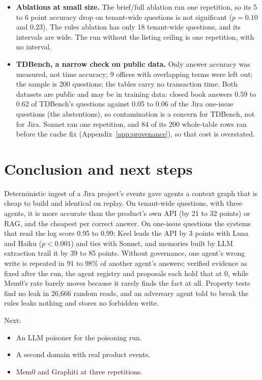 \documentclass{article}
\begin{document}
\begin{itemize}[leftmargin=*]
\item \textbf{Ablations at small size.} The brief/full ablation ran one repetition, so its 5 to 6 point accuracy drop on tenant-wide questions is not significant ($p = 0.10$ and $0.23$). The rules ablation has only 18 tenant-wide questions, and its intervals are wide. The run without the listing ceiling is one repetition, with no interval.
\item \textbf{TDBench, a narrow check on public data.} Only answer accuracy was measured, not time accuracy; 9 offices with overlapping terms were left out; the sample is 200 questions; the tables carry no transaction time. Both datasets are public and may be in training data: closed book answers 0.59 to 0.62 of TDBench's questions against 0.05 to 0.06 of the Jira one-issue questions (the abstentions), so contamination is a concern for TDBench, not for Jira. Sonnet ran one repetition, and 84 of its 200 whole-table rows ran before the cache fix (Appendix~\ref{app:provenance}), so that cost is overstated.
\end{itemize}

\section{Conclusion and next steps}
\label{sec:conclusion}

Deterministic ingest of a Jira project's events gave agents a context graph that is cheap to build and identical on replay. On tenant-wide questions, with three agents, it is more accurate than the product's own API (by 21 to 32 points) or RAG, and the cheapest per correct answer. On one-issue questions the systems that read the log score 0.95 to 0.99; Keel leads the API by 3 points with Luna and Haiku ($p < 0.001$) and ties with Sonnet, and memories built by LLM extraction trail it by 39 to 85 points. Without governance, one agent's wrong write is repeated in 91 to 98\% of another agent's answers; verified evidence as fixed after the run, the agent registry and proposals each hold that at 0, while Mem0's rate barely moves because it rarely finds the fact at all. Property tests find no leak in 26,666 random reads, and an adversary agent told to break the rules leaks nothing and stores no forbidden write.

Next:

\begin{itemize}[leftmargin=*]
\item An LLM poisoner for the poisoning run.
\item A second domain with real product events.
\item Mem0 and Graphiti at three repetitions.
\end{itemize}
\end{document}
